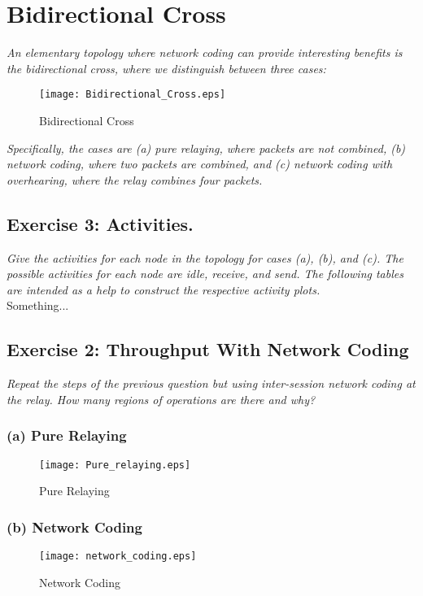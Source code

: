 \section{Bidirectional Cross}
\textit{An elementary topology where network coding can provide interesting benefits is the bidirectional cross, where we distinguish between three cases:}\\

\begin{figure}[!h]
  \centering
  \texttt{[image: Bidirectional\_Cross.eps]}
  \caption{Bidirectional Cross}
  \label{fig:Bidirectional_Cross}
\end{figure}

\textit{Specifically, the cases are (a) pure relaying, where packets are not combined, (b) network coding, where two packets are combined, and (c) network coding with overhearing, where the relay combines four packets.}


\subsection{Exercise 3: Activities.}
\textit{Give the activities for each node in the topology for cases (a), (b), and (c). The possible activities for each node are idle, receive, and send. The following tables are intended as a help to construct the respective activity plots.}\\

Something...

\subsection{Exercise 2: Throughput With Network Coding}
\textit{Repeat the steps of the previous question but using inter-session network coding at the relay. How many regions of operations are there and why?}

\subsubsection{(a) Pure Relaying}
\begin{figure}[!h]
  \centering
  \texttt{[image: Pure\_relaying.eps]}
  \caption{Pure Relaying}
  \label{fig:Pure_relaying}
\end{figure}
\newpage
\subsubsection{(b) Network Coding}
\begin{figure}[!h]
  \centering
  \texttt{[image: network\_coding.eps]}
  \caption{Network Coding}
  \label{fig:network_coding}
\end{figure}
\newpage
